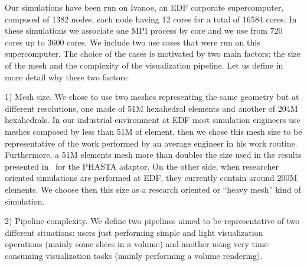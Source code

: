 Our simulations have been run on Ivanoe, an EDF corporate supercomputer,
composed of 1382 nodes, each node having 12 cores for a total of 16584 cores. In
these simulations we associate one MPI process by core and we use from 720 cores up
to 3600 cores. We include two use cases that were run on this supercomputer. The
choice of the cases is motivated by two main factors: the size of the mesh and
the complexity of the visualization pipeline. Let us define in more detail why
these two factors:

1) Mesh size. We chose to use two meshes representing the same geometry but at
different resolutions, one made of 51M hexahedral elements and another of 204M
hexahedrals. In our industrial environment at EDF most simulation engineers use
meshes composed by less than 51M of element, then we chose this mesh size to be
representative of the work performed by an average engineer in his work routine.
Furthermore, a 51M elements mesh more than doubles the size used in the results
presented in~\cite{6092322} for the PHASTA adaptor. On the other side, when researcher
oriented simulations are performed at EDF, they currently contain around 200M
elements. We choose then this size as a research oriented or ``heavy mesh'' kind
of simulation.

2) Pipeline complexity. We define two pipelines aimed to be representative of two
different situations: users just performing simple and light visualization
operations (mainly some slices in a volume) and another using very
time-consuming visualization tasks (mainly performing a volume rendering).

